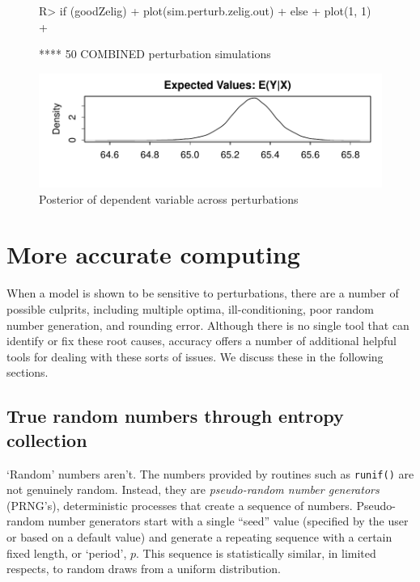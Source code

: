 \documentclass[11pt]{article}
\let\code=\texttt
\newcommand{\pkg}[1]{{\normalfont\fontseries{b}\selectfont #1}}
\begin{document}
\begin{figure}
\begin{Schunk}
\begin{Sinput}
R> if (goodZelig) {
+     plot(sim.perturb.zelig.out)
+ } else {
+     plot(1, 1)
+ }
\end{Sinput}
\begin{Soutput}
**** 50  COMBINED perturbation simulations 
\end{Soutput}
\end{Schunk}
\includegraphics{accuracy_vignette-plot2a}
\caption{\label{fig:plot2} Posterior of dependent variable across perturbations}
\end{figure}


\section{More accurate computing} 

When a model is shown to be sensitive to perturbations, there are a number of possible culprits, including multiple optima, ill-conditioning, poor random number generation, and rounding error. Although there is no single tool that can identify or fix these root causes, \pkg{accuracy} offers a number of additional helpful tools for dealing with these sorts of issues. We discuss these in the following sections. 

\subsection{True random numbers through entropy collection}

`Random' numbers aren't. The numbers provided by routines such as \code{runif()} are not genuinely random.
 Instead, they are \emph{pseudo-random number generators}
(PRNG's), deterministic processes that create a sequence of numbers. 
Pseudo-random number generators start with a single ``seed'' value (specified by the user or based on a default value)
 and generate a repeating sequence with a certain
fixed length, or `period', $p$. This sequence is statistically
similar, in limited respects, to random draws from a uniform
distribution.
\end{document}
